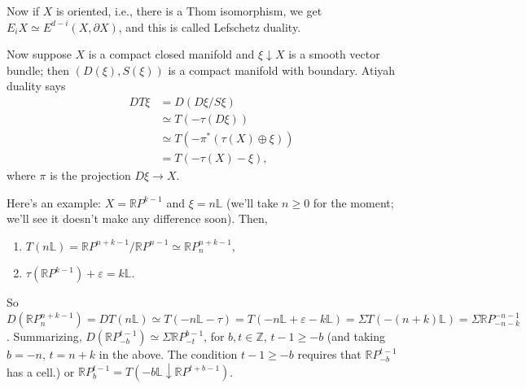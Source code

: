 \documentclass{article}
\newcommand{\ConfusedBox}[1]{
\begin{center}\scalebox{.5}{\fbox{\begin{minipage}{\textwidth}
#1
\end{minipage}}}
\end{center}
}
\newcommand{\Z}{\mathbb{Z}}
\newcommand{\R}{\mathbb{R}}
\newcommand{\RP}{\R P}
\newcommand{\bundle}[1]{\mathbb{#1}}
\newcommand{\Suspend}{\Sigma}
\renewcommand{\to}{\longrightarrow}
\theoremstyle{definition}
\begin{document}
\ConfusedBox{
\scalebox{15.3}{resume}
}

Now if $X$ is oriented, i.e., there is a Thom isomorphism, we get $E_i X \simeq E^{d-i}(X, \partial X)$, and this is called Lefschetz duality.

Now suppose $X$ is a compact closed manifold and $\xi \downarrow X$ is a smooth vector bundle; then $(D(\xi), S(\xi))$ is a compact manifold with boundary.  Atiyah duality says
\begin{align*}
DT\xi & = D(D\xi / S\xi) \\
& \simeq T(-\tau(D\xi)) \\
& \simeq T(-\pi^*(\tau(X) \oplus \xi)) \\
& = T(-\tau(X) - \xi),
\end{align*}
where $\pi$ is the projection $D\xi \to X$.

Here's an example: $X = \RP^{k-1}$ and $\xi = n \bundle{L}$ (we'll take $n \ge 0$ for the moment; we'll see it doesn't make any difference soon).  Then,
\begin{enumerate}
\item $T(n \bundle{L}) = \RP^{n+k-1} / \RP^{n-1} \simeq \RP^{n+k-1}_n$,
\item $\tau(\RP^{k-1}) + \varepsilon = k \bundle{L}$.
\end{enumerate}
So $D(\RP^{n+k-1}_n) = DT(n\bundle{L}) \simeq T(-n \bundle{L} - \tau) = T(-n \bundle{L} + \varepsilon -k \bundle{L}) = \Suspend T(-(n+k)\bundle{L}) = \Suspend \RP^{-n-1}_{-n-k}$.  Summarizing, $D(\RP^{t-1}_{-b}) \simeq \Suspend \RP^{b-1}_{-t}$, for $b, t \in \Z$, $t-1 \ge -b$ (and taking $b = -n$, $t = n+k$ in the above.  The condition $t-1 \ge -b$ requires that $\RP^{t-1}_{-b}$ has a cell.) or $\RP^{t-1}_b = T(-b \bundle{L} \downarrow \RP^{t+b-1})$.
\end{document}
